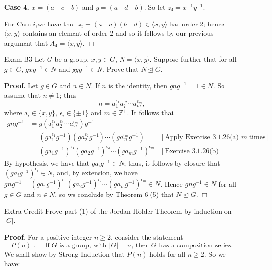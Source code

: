 \documentclass[9pt]{article}
\newcommand{\qed}{\hfill \ensuremath{\Box}}
\newcommand{\cyc}[1]{\langle #1 \rangle}
\newcommand{\Z}{\mathbb{Z}}
\begin{document}
\begin{enumerate}
      \textbf{Case 4.} $x = (a \quad c \quad b)$ and $y = (a \quad d \quad b)$.      
      So let $z_4 = x^{-1}y^{-1}$.
      
      For Case $i$,we have that $z_i =  (a \quad c)(b \quad d) \in \cyc{x, y}$
      has order 2; hence $\cyc{x, y}$ contains an element of order 2 and so it
      follows by our previous argument that $A_4 = \cyc{x, y}$. \qed
   \item[Exam B3] Let $G$ be a group, $x, y \in G$, $N = \cyc{x, y}$. Suppose
                  further that for all $g \in G$, $gxg^{-1} \in N$ and
                  $gyg^{-1} \in N$. Prove that $N \trianglelefteq G$.
                  
      \textbf{Proof.} Let $g \in G$ and $n \in N$. If $n$ is the identity, then
      $gng^{-1} = 1 \in N$. So assume that $n \neq 1$; thus
      $$n = a_1^{\epsilon_1}a_2^{\epsilon_2}\cdots a_m^{\epsilon_m},$$
      where $a_i \in \{x, y\}$, $\epsilon_i \in \{\pm1\}$ and $m \in \Z^+$. It
      follows that
      \begin{align*}
         gng^{-1} &= g(a_1^{\epsilon_1}a_2^{\epsilon_2}\cdots
            a_m^{\epsilon_m})g^{-1} \\
            &= (ga_1^{\epsilon_1}g^{-1})(ga_2^{\epsilon_2}g^{-1})\cdots
            (ga_m^{\epsilon_m}g^{-1}) &[\text{Apply Exercise 3.1.26(a) } m
               \text{ times}] \\
            &= (ga_1g^{-1})^{\epsilon_1}(ga_2g^{-1})^{\epsilon_2}\cdots
            (ga_mg^{-1})^{\epsilon_m} &[\text{Exercise 3.1.26(b)}]
      \end{align*}
      By hypothesis, we have that $ga_ig^{-1} \in N$; thus, it follows by
      closure that $(ga_ig^{-1})^{\epsilon_i} \in N$, and, by extension, we have
      $gng^{-1} = (ga_1g^{-1})^{\epsilon_1}(ga_2g^{-1})^{\epsilon_2}\cdots
            (ga_mg^{-1})^{\epsilon_m} \in N$. Hence $gng^{-1} \in N$ for all
      $g \in G$ and $n \in N$, so we conclude by Theorem 6 (5) that
      $N \trianglelefteq G$. \qed
   \item[Extra Credit]  Prove part (1) of the Jordan-H$\ddot{\text{o}}$lder
                        Theorem by induction on $|G|$.
                        
      \textbf{Proof.} For a positive integer $n \ge 2$, consider the statement
      \begin{equation*}
         P(n) := \text{ If $G$ is a group, with $|G| = n$, then $G$ has a
         composition series}.
      \end{equation*}
      We shall show by Strong Induction that $P(n)$ holds for all $n \ge 2$. So
      we have:
      

\end{enumerate}
\end{document}
